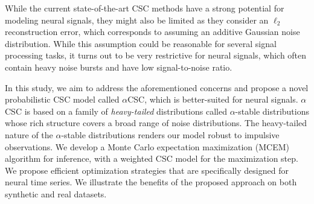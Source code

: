 

While the current state-of-the-art CSC methods have a strong potential for modeling neural signals, they might also be limited as they consider an $\ell_2$ reconstruction error, which corresponds to assuming an additive Gaussian noise distribution. While this assumption could be reasonable for several signal processing tasks, it turns out to be very restrictive for neural signals, which often contain heavy noise bursts and have low signal-to-noise ratio.

%

In this study, we aim to address the aforementioned concerns and propose a novel probabilistic CSC model called $\alpha$CSC, which is better-suited for neural signals. $\alpha$CSC is based on a family of \emph{heavy-tailed} distributions called $\alpha$-stable distributions \cite{samorodnitsky1994stable} whose rich structure covers a broad range of noise distributions. The heavy-tailed nature of the $\alpha$-stable distributions renders our model robust to impulsive observations. We develop a Monte Carlo expectation maximization (MCEM) algorithm for inference, with a weighted CSC model for the maximization step. We propose efficient optimization strategies that are specifically designed for neural time series.
%
We illustrate the benefits of the proposed approach on both synthetic and real datasets.








